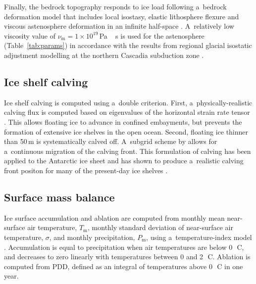 \documentclass[tc, manuscript]{copernicus}
\begin{document}
      Finally, the bedrock topography responds to ice load following
      a~bedrock deformation model that includes local isostasy, elastic
      lithosphere flexure and viscous astenosphere deformation in an
      infinite half-space \citep{Lingle.Clark.1985,Bueler.etal.2007}.
      A~relatively low viscosity value of $\nu_{\mathrm{m}} =
      1\times10^{19}$\,\unit{Pa\,s} is used for the astenosphere
      (Table~\ref{tab:params}) in accordance with the results from regional
      glacial isostatic adjustment modelling at the northern Cascadia
      subduction zone \citep{James.etal.2009}.

\subsection{Ice shelf calving}
\label{sec:calving}

      Ice shelf calving is computed using a~double criterion. First,
      a~physically-realistic calving flux is computed based on eigenvalues
      of the horizontal strain rate tensor \citep{Winkelmann.etal.2011,
      Levermann.etal.2012}. This allows floating ice to advance in confined
      embayments, but prevents the formation of extensive ice shelves in the
      open ocean. Second, floating ice thinner than 50\,\unit{m} is
      systematically calved off. A~subgrid scheme by
      \citet{Albrecht.etal.2011} allows for a~continuous migration of the
      calving front. This formulation of calving has been applied to the
      Antarctic ice sheet and has shown to produce a~realistic calving front
      positon for many of the present-day ice shelves
      \citep{Martin.etal.2011}.

\subsection{Surface mass balance}
\label{sec:surface}

      Ice surface accumulation and ablation are computed from monthly mean
      near-surface air temperature, $T_{\mathrm{m}}$, monthly standard
      deviation of near-surface air temperature, $\sigma$, and monthly
      precipitation, $P_{\mathrm{m}}$, using a~temperature-index model
      \citep[e.g.,][]{Hock.2003}. Accumulation is equal to precipitation
      when air temperatures are below 0\,\unit{{\degree}C}, and decreases to
      zero linearly with temperatures between 0 and 2\,\unit{{\degree}C}.
      Ablation is computed from PDD, defined as an integral of temperatures
      above 0\,\unit{{\degree}C} in one year.
\end{document}
